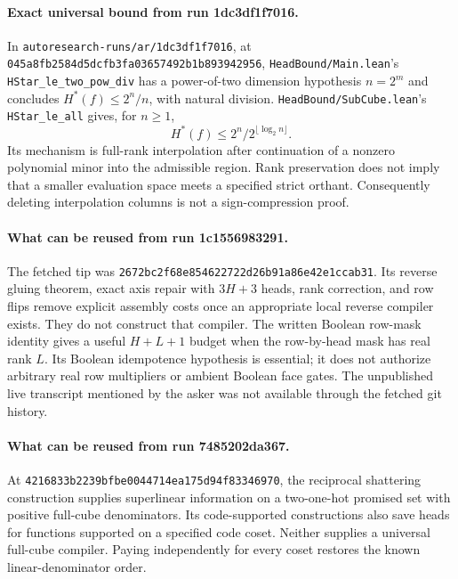 \documentclass[11pt]{article}
\begin{document}
\paragraph{Exact universal bound from run 1dc3df1f7016.}
In \texttt{autoresearch-runs/ar/1dc3df1f7016}, at
\texttt{045a8fb2584d5dcfb3fa03657492b1b893942956},
\texttt{HeadBound/Main.lean}'s \texttt{HStar\_le\_two\_pow\_div}
has a power-of-two dimension hypothesis $n=2^m$ and concludes
$H^*(f)\le 2^n/n$, with natural division.
\texttt{HeadBound/SubCube.lean}'s \texttt{HStar\_le\_all} gives,
for $n\ge1$,
\[
 H^*(f)\le 2^n/2^{\lfloor\log_2 n\rfloor}.
\]
Its mechanism is full-rank interpolation after continuation of a
nonzero polynomial minor into the admissible region. Rank preservation
does not imply that a smaller evaluation space meets a specified strict
orthant. Consequently deleting interpolation columns is not a
sign-compression proof.

\paragraph{What can be reused from run 1c1556983291.}
The fetched tip was \texttt{2672bc2f68e854622722d26b91a86e42e1ccab31}.
Its reverse gluing theorem, exact axis repair with $3H+3$ heads, rank
correction, and row flips remove explicit assembly costs once an
appropriate local reverse compiler exists. They do not construct that
compiler. The written Boolean row-mask identity gives a useful
$H+L+1$ budget when the row-by-head mask has real rank $L$.
Its Boolean idempotence hypothesis is essential; it does not authorize
arbitrary real row multipliers or ambient Boolean face gates.
The unpublished live transcript mentioned by the asker was not available
through the fetched git history.

\paragraph{What can be reused from run 7485202da367.}
At \texttt{4216833b2239bfbe0044714ea175d94f83346970}, the reciprocal
shattering construction supplies superlinear information on a
two-one-hot promised set with positive full-cube denominators.
Its code-supported constructions also save heads for functions supported
on a specified code coset. Neither supplies a universal full-cube
compiler. Paying independently for every coset restores the known
linear-denominator order.
\end{document}
